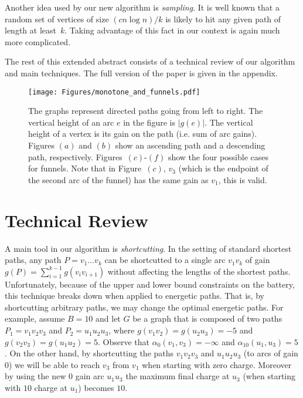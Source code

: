 \documentclass[11pt]{article}
\begin{document}
Another idea used by our new algorithm is \emph{sampling}. It is well known that a random set of vertices of size $(cn\log n)/k$ is likely to hit any given path of length at least~$k$. Taking advantage of this fact in our context is again much more complicated.


The rest of this extended abstract consists of a technical review of our algorithm and main techniques. The full version of the paper is given in the appendix.

\begin{figure}[t]
    \centering
    \texttt{[image: Figures/monotone\_and\_funnels.pdf]}
    \caption{
    The graphs represent directed paths going from left to right. The vertical height of an arc $e$ in the figure is $|g(e)|$. 
    The vertical height of a vertex is its gain on the path (i.e. sum of arc gains). 
    Figures $(a)$ and $(b)$ show an ascending path and a descending path, respectively. 
    Figures~$(c)$-$(f)$ show the four possible cases for funnels. Note that in Figure~$(c)$, $v_3$ (which is the endpoint of the second arc of the funnel) has the same gain as $v_1$, this is valid.}
    \label{fig:example_funnel_monotone}
\end{figure}

\section{Technical Review}\label{sec:technical-review}

A main tool in our algorithm is \emph{shortcutting}. In the setting of standard shortest paths, any path $P=v_1\ldots v_k$ can be shortcutted to a single arc $v_1 v_k$ of gain $g(P)= \sum_{i=1}^{k-1} g(v_i v_{i+1})$ without affecting the lengths of the shortest paths. Unfortunately, because of the upper and lower bound constraints on the battery, this technique breaks down when applied to energetic paths. That is, by shortcutting arbitrary paths, we may change the optimal energetic paths. For example, assume $B = 10$ and let $G$ be a graph that is composed of two paths $P_1=v_1 v_2 v_3$ and $P_2 = u_1 u_2 u_3$, where $g(v_1 v_2) = g(u_2 u_3) = -5$ and $g(v_2 v_3) = g(u_1 u_2)=5$. 
Observe that $\alpha_0(v_1, v_3) = -\infty$ and $\alpha_{10}(u_1, u_3) = 5$. 
On the other hand, by shortcutting the paths $v_1 v_2 v_3$ and $u_1 u_2 u_3$ (to arcs of gain $0$) we will be able to reach $v_3$ from $v_1$ when starting with zero charge. Moreover by using the new $0$ gain arc $u_1 u_3$ the maximum final charge at $u_3$ (when starting with $10$ charge at $u_1$) becomes $10$.
\end{document}

